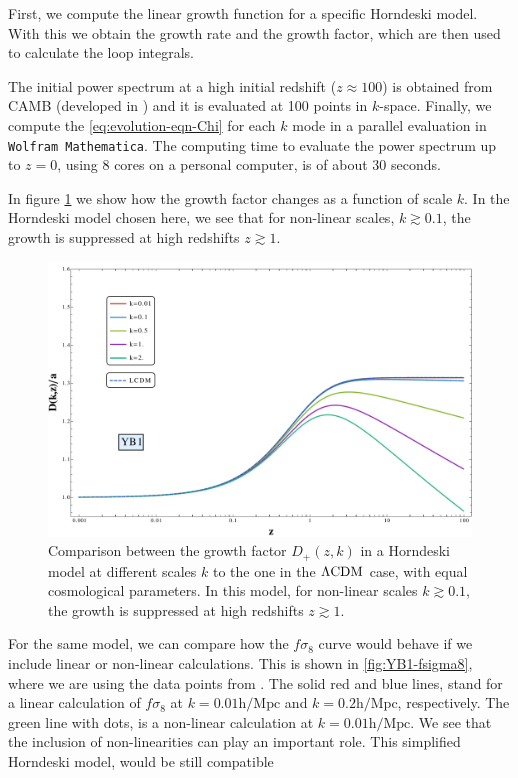 First, we compute the linear growth function for a specific Horndeski
model. With this we
obtain the growth rate and the growth factor, which are then used
to calculate the loop integrals.

The initial power spectrum at a high initial redshift ($z \approx 100$)
is obtained from CAMB (developed in \cite{lewis_efficient_2000})
and it is evaluated
at 100 points in $k$-space. 
Finally, we compute the \ref{eq:evolution-eqn-Chi} for each $k$ mode
in  a parallel evaluation in \texttt{Wolfram Mathematica}. 
The computing time to evaluate the power spectrum up to $z=0$,
using 8 cores on a personal computer, is of about
30 seconds.

In figure \cref{fig:change-Dplus-Y} we show how the growth factor 
changes as a function of scale $k$. In the Horndeski model chosen here, we see that
for non-linear scales, $k \gtrsim 0.1$, the growth 
is suppressed at high redshifts $z\gtrsim 1$.
\begin{figure}[tbph]
	\centering
	\includegraphics[width=0.7\linewidth]{Chapters/resummation-plots/Dgrowth-YB1}
	\caption[Growth factor in Horndeski.]{Comparison between the growth factor $D_{+}(z,k)$ in a Horndeski model at different
	scales $k$ to the one in the $\Lambda\mathrm{CDM}$ case, with equal cosmological parameters. In this model, for non-linear scales $k \gtrsim 0.1$, the growth 
is suppressed at high redshifts $z\gtrsim 1$.}
	\label{fig:change-Dplus-Y}
\end{figure}
For the same model, we can compare how the $f \sigma_{8}$ curve would behave if we include linear or non-linear calculations. This is
shown in \cref{fig:YB1-fsigma8}, where we are using the data points from .
The solid red and blue lines, stand for a linear calculation of $f \sigma_{8}$ at $k=0.01 \mathrm{h/Mpc}$ and 
$k=0.2 \mathrm{h/Mpc}$, respectively. The green line with dots, is a non-linear calculation at  $k=0.01 \mathrm{h/Mpc}$.
We see that the inclusion of non-linearities can play an important role. This simplified Horndeski model, would be still compatible
